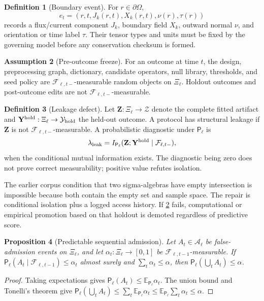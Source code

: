 \documentclass[11pt,a4paper]{article}
\theoremstyle{definition}
\newtheorem{definition}{Definition}[section]
\newtheorem{assumption}[definition]{Assumption}
\theoremstyle{plain}
\newtheorem{proposition}[definition]{Proposition}
\theoremstyle{remark}
\newcommand{\Prob}{\mathsf P}
\newcommand{\E}{\mathbb E}
\begin{document}
\begin{definition}[Boundary event]\label{def:boundaryevent}
For \(r\in\partial\Omega\),
\[
e_t=(r,t,J_k(r,t),X_k(r,t),\nu(r),\tau(r))
\]
records a flux/current component \(J_k\), boundary field \(X_k\), outward
normal \(\nu\), and orientation or time label \(\tau\).  Their tensor types and
units must be fixed by the governing model before any conservation checksum is
formed.
\end{definition}

\begin{assumption}[Pre-outcome freeze]\label{ass:freeze}
For an outcome at time \(t\), the design, preprocessing graph, dictionary,
candidate operators, null library, thresholds, and seed policy are
\(\mathcal F_{\ell,t-}\)-measurable random objects on \(\Xi_\ell\).
Holdout outcomes and post-outcome edits are not
\(\mathcal F_{\ell,t-}\)-measurable.
\end{assumption}

\begin{definition}[Leakage defect]\label{def:leakage}
Let \(\mathbf Z:\Xi_\ell\to\mathcal Z\) denote the complete fitted artifact
and \(\mathbf Y^{\rm hold}:\Xi_\ell\to\mathcal Y_{\rm hold}\) the held-out
outcome.  A protocol has structural leakage if \(\mathbf Z\) is not
\(\mathcal F_{\ell,t-}\)-measurable.  A probabilistic diagnostic under
\(\Prob_\ell\) is
\[
\lambda_{\rm leak}
=I_{\Prob_\ell}(\mathbf Z;\mathbf Y^{\rm hold}\mid
\mathcal F_{\ell,t-}),
\]
when the conditional mutual information exists.  The diagnostic being zero
does not prove correct measurability; positive value refutes isolation.
\end{definition}

The earlier corpus condition that two sigma-algebras have empty intersection
is impossible because both contain the empty set and sample space.  The repair
is conditional isolation plus a logged access history.  If
\cref{ass:freeze} fails, computational or empirical promotion based on that
holdout is demoted regardless of predictive score.

\begin{proposition}[Predictable sequential admission]\label{prop:sequential}
Let \(A_t\in\mathcal A_\ell\) be false-admission events on \(\Xi_\ell\), and
let \(\alpha_t:\Xi_\ell\to[0,1]\) be
\(\mathcal F_{\ell,t-1}\)-measurable.  If
\(\Prob_\ell(A_t\mid\mathcal F_{\ell,t-1})\le\alpha_t\) almost surely and
\(\sum_t\alpha_t\le\alpha\), then
\(\Prob_\ell(\bigcup_tA_t)\le\alpha\).
\end{proposition}
\begin{proof}
Taking expectations gives
\(\Prob_\ell(A_t)\le\E_{\Prob_\ell}\alpha_t\).  The union bound and
Tonelli's theorem give
\(\Prob_\ell(\bigcup_tA_t)\le\sum_t\E_{\Prob_\ell}\alpha_t
\le\E_{\Prob_\ell}\sum_t\alpha_t\le\alpha\).
\end{proof}
\end{document}
